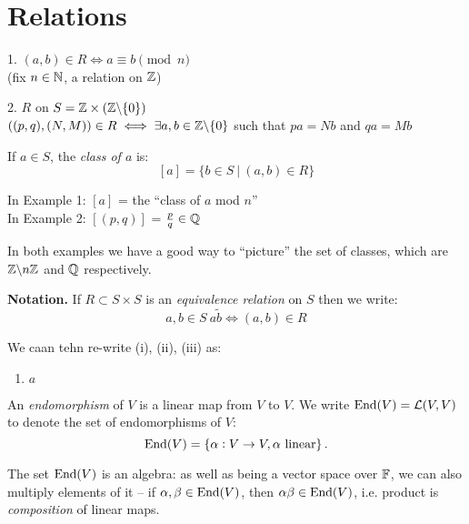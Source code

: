 \setcounter{lecture}{2}
\pagebreak
\section{Relations}



\begin{examples}

\item[1.] $(a,b) \in R \iff a \equiv b \pmod{n}$\\
(fix $n \in \mathbb{N}$, a relation on $\mathbb{Z}$)

\item[2.] $R$ on $S = \mathbb{Z} \times (\mathbb{Z} \backslash\{0\})$\\
$((p,q),(N,M)) \in R \iff \exists a,b \in \mathbb{Z}\backslash\{0\}$ such that $pa = Nb$ and $qa = Mb$
\end{examples}

\begin{definition}If $a \in S$, the \emph{class of $a$} is:
\[[a] = \{b \in S ~|~ (a,b) \in R\}\]
\end{definition}

In Example 1: $[a]$ = the ``class of $a$ mod $n$''\\
In Example 2: $[(p,q)]$ = $\frac{p}{q} \in \mathbb{Q}$

In both examples we have a good way to ``picture'' the set of classes, which are $\mathbb{Z} \backslash n\mathbb{Z}$ and $\mathbb{Q}$ respectively. 


\textbf{Notation.} If $R \subset S \times S$ is an \emph{equivalence relation} on $S$ then we write:\[a,b \in S~ a \tilde b \iff (a,b) \in R\]

We caan tehn re-write (i), (ii), (iii) as:
\begin{enumerate}
\item $a$	
\end{enumerate}
	


\begin{definition}
	An \emph{endomorphism} of $V$ is a linear map from $V$ to $V$. We write $\operatorname{End}(V) = \operatorname{\mathcal{L}}(V,V)$ to denote the set of endomorphisms of $V$: %
	\begin{equation*}
		\operatorname{End}(V) = \left\{\alpha:V\to V,\alpha \text{ linear}\right\}.
	\end{equation*}
\end{definition}

The set $\operatorname{End}(V)$ is an algebra: as well as being  a vector space over $\mathbb{F}$, we can also multiply elements of it -- if  $\alpha, \beta\in\operatorname{End}(V)$, then $\alpha \beta \in \operatorname{End}(V)$, i.e.{} product is \emph{composition} of linear maps.

